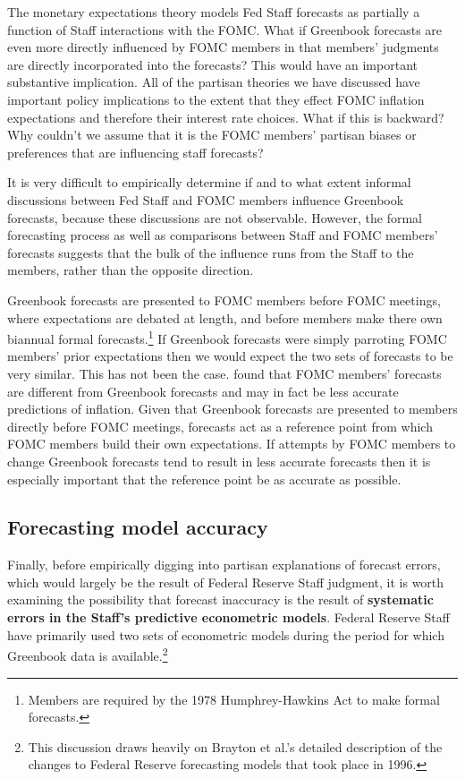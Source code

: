 \documentclass[a4paper]{article}
\begin{document}
The monetary expectations theory models Fed Staff forecasts as partially a function of Staff interactions with the FOMC. What if Greenbook forecasts are even more directly influenced by FOMC members in that members' judgments are directly incorporated into the forecasts? This would have an important substantive implication. All of the partisan theories we have discussed have important policy implications to the extent that they effect FOMC inflation expectations and therefore their interest rate choices. What if this is backward? Why couldn't we assume that it is the FOMC members' partisan biases or preferences that are influencing staff forecasts?

It is very difficult to empirically determine if and to what extent informal discussions between Fed Staff and FOMC members influence Greenbook forecasts, because these discussions are not observable. However, the formal forecasting process as well as comparisons between Staff and FOMC members' forecasts suggests that the bulk of the influence runs from the Staff to the members, rather than the opposite direction.

Greenbook forecasts are presented to FOMC members before FOMC meetings, where expectations are debated at length, and before members make there own biannual formal forecasts.\footnote{Members are required by the 1978 Humphrey-Hawkins Act to make formal forecasts.} If Greenbook forecasts were simply parroting FOMC members' prior expectations then we would expect the two sets of forecasts to be very similar. This has not been the case. \cite{RomerRomer2008} found that FOMC members' forecasts are different from Greenbook forecasts and may in fact be less accurate predictions of inflation. Given that Greenbook forecasts are presented to members directly before FOMC meetings, forecasts act as a reference point from which FOMC members build their own expectations. If attempts by FOMC members to change Greenbook forecasts tend to result in less accurate forecasts then it is especially important that the reference point be as accurate as possible.

\subsection{Forecasting model accuracy}

Finally, before empirically digging into partisan explanations of forecast errors, which would largely be the result of Federal Reserve Staff judgment, it is worth examining the possibility that forecast inaccuracy is the result of \textbf{systematic errors in the Staff's predictive econometric models}. Federal Reserve Staff have primarily used two sets of econometric models during the period for which Greenbook data is available.\footnote{This discussion draws heavily on Brayton et al.'s \citeyear{Brayton1997} detailed description of the changes to Federal Reserve forecasting models that took place in 1996.}
\end{document}
